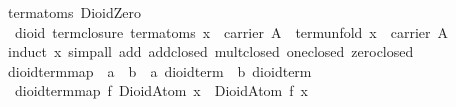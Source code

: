 \begin{isabellebody}
{}\ {}term{}atoms\ DioidZero\ {}\ {}{}{}\isanewline
\isanewline
{}\isamarkupfalse%
\ {}\ dioid{}\ term{}closure{}\ {}term{}atoms\ x\ {}\ carrier\ A\ {}\ term{}unfold\ x\ {}\ carrier\ A{}\isanewline
%
\isadelimproof
\ \ %
\endisadelimproof
%
\isatagproof
{}\isamarkupfalse%
\ {}induct\ x{}\ simp{}all\ add{}\ add{}closed\ mult{}closed\ one{}closed\ zero{}closed{}%
\endisatagproof
{\isafoldproof}%
%
\isadelimproof
\isanewline
%
\endisadelimproof
\isanewline
{}\isamarkupfalse%
\ dioid{}term{}map\ {}{}\ {}{}{}a\ {}\ {}b{}\ {}\ {}a\ dioid{}term\ {}\ {}b\ dioid{}term{}\ \isanewline
\ \ {}dioid{}term{}map\ f\ {}DioidAtom\ x{}\ {}\ DioidAtom\ {}f\ x{}{}\isanewline

\end{isabellebody}
